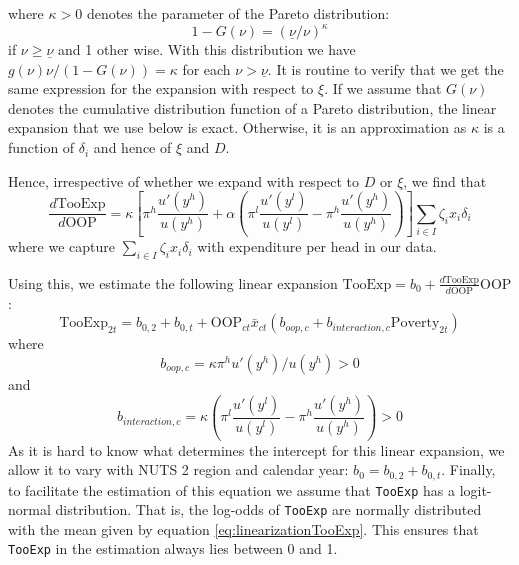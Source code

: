 \documentclass[a4paper,12pt]{article}
\begin{document}
where \(\kappa > 0\) denotes the parameter of the Pareto distribution:
\begin{equation}
1-G(\nu) = \left( \underline \nu/{\nu} \right)^{\kappa}
\end{equation}
if \(\nu \geq \underline \nu\) and 1 other wise. With this distribution we have \(g(\nu)\nu/(1-G(\nu)) = \kappa\) for each \(\nu > \underline \nu\). It is routine to verify that we get the same expression for the expansion with respect to \(\xi\). If we assume that \(G(\nu)\) denotes the cumulative distribution function of a Pareto distribution, the linear expansion that we use below is exact. Otherwise, it is an approximation as \(\kappa\) is a function of \(\delta_i\) and hence of \(\xi\) and \(D\).

Hence, irrespective of whether we expand with respect to \(D\) or \(\xi\), we find that
\begin{equation}
\frac{d \text{TooExp}}{d \text{OOP}} = \kappa \left[ \pi^h \frac{u'(y^{h})}{u(y^h)} + \alpha \left( \pi^l \frac{u'(y^{l})}{u(y^l)}- \pi^h \frac{u'(y^{h})}{u(y^h)}  \right)
\right] \sum_{i \in I} \zeta_i x_i \delta_i
\end{equation}
where we capture \(\sum_{i \in I} \zeta_i x_i \delta_i\) with expenditure per head in our data.

Using this, we estimate the following linear expansion \(\text{TooExp} = b_0 + \frac{d \text{TooExp}}{d \text{OOP}} \text{OOP}\):
\begin{equation}
\label{eq:linearizationTooExp}
\text{TooExp}_{2t} = b_{0,2} + b_{0,t} +  \text{OOP}_{ct} \bar x_{ct} \left( b_{oop,c}+ b_{interaction,c} \text{Poverty}_{2t} \right)
\end{equation}
where
\begin{equation}
b_{oop,c} = \kappa \pi^h u'(y^h)/u(y^h) >0
\end{equation}
and
\begin{equation}
b_{interaction,c} = \kappa \left( \pi^l \frac{u'(y^{l})}{u(y^l)}- \pi^h \frac{u'(y^{h})}{u(y^h)}  \right) > 0
\end{equation}
As it is hard to know what determines the intercept for this linear expansion, we allow it to vary with NUTS 2 region and calendar year: \(b_0 = b_{0,2} + b_{0,t}\). Finally, to facilitate the estimation of this equation we assume that \texttt{TooExp} has a logit-normal distribution. That is, the log-odds of \texttt{TooExp} are normally distributed with the mean given by equation \eqref{eq:linearizationTooExp}. This ensures that \texttt{TooExp} in the estimation always lies between 0 and 1.
\end{document}
